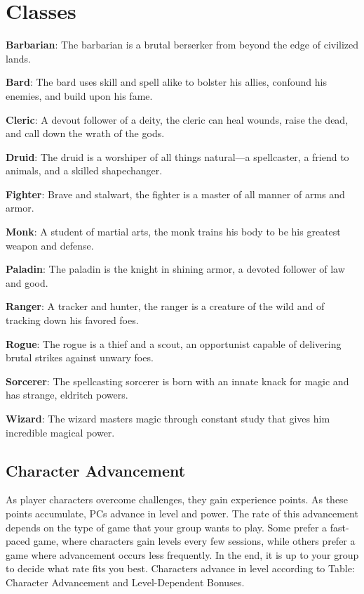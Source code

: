 		
\chapter{Classes}

\label{f0}				
\textbf{Barbarian}: The barbarian is a brutal berserker from beyond the edge of civilized lands.
				
\textbf{Bard}: The bard uses skill and spell alike to bolster his allies, confound his enemies, and build upon his fame.
				
\textbf{Cleric}: A devout follower of a deity, the cleric can heal wounds, raise the dead, and call down the wrath of the gods.
				
\textbf{Druid}: The druid is a worshiper of all things natural---a spellcaster, a friend to animals, and a skilled shapechanger.
				
\textbf{Fighter}: Brave and stalwart, the fighter is a master of all manner of arms and armor.
				
\textbf{Monk}: A student of martial arts, the monk trains his body to be his greatest weapon and defense.
				
\textbf{Paladin}: The paladin is the knight in shining armor, a devoted follower of law and good.
				
\textbf{Ranger}: A tracker and hunter, the ranger is a creature of the wild and of tracking down his favored foes.
				
\textbf{Rogue}: The rogue is a thief and a scout, an opportunist capable of delivering brutal strikes against unwary foes.
				
\textbf{Sorcerer}: The spellcasting sorcerer is born with an innate knack for magic and has strange, eldritch powers.
				
\textbf{Wizard}: The wizard masters magic through constant study that gives him incredible magical power.
				
\section{Character Advancement}

				
As player characters overcome challenges, they gain experience points. As these points accumulate, PCs advance in level and power. The rate of this advancement depends on the type of game that your group wants to play. Some prefer a fast-paced game, where characters gain levels every few sessions, while others prefer a game where advancement occurs less frequently. In the end, it is up to your group to decide what rate fits you best. Characters advance in level according to Table: Character Advancement and Level-Dependent Bonuses.
				
